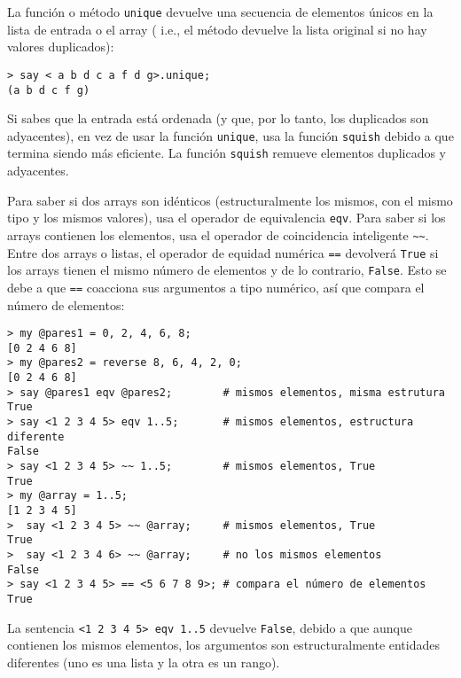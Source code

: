 La función o método {\tt unique} devuelve una secuencia
de elementos únicos en la lista de entrada o el array (
i.e., el método devuelve la lista original si no hay valores
duplicados):

\begin{lstlisting}
> say < a b d c a f d g>.unique;
(a b d c f g)
\end{lstlisting}

Si sabes que la entrada está ordenada (y que, por lo tanto,
los duplicados son adyacentes), en vez de usar la función
{\tt unique}, usa la función {\tt squish} debido a que termina
siendo más eficiente. La función {\tt squish} remueve elementos
duplicados y adyacentes.

Para saber si dos arrays son idénticos (estructuralmente 
los mismos, con el mismo tipo y los mismos valores), usa 
el operador de equivalencia {\tt eqv}. Para saber si los arrays
contienen los elementos, usa el operador de coincidencia inteligente
\verb|~~|. Entre dos arrays o listas, el operador de equidad numérica
\verb|==| devolverá {\tt True} si los arrays tienen el mismo número 
de elementos y de lo contrario, {\tt False}. Esto se debe a que
\verb|==| coacciona sus argumentos a tipo numérico, así que compara
el número de elementos:

\begin{lstlisting}
> my @pares1 = 0, 2, 4, 6, 8;
[0 2 4 6 8]
> my @pares2 = reverse 8, 6, 4, 2, 0;
[0 2 4 6 8]
> say @pares1 eqv @pares2;        # mismos elementos, misma estrutura
True
> say <1 2 3 4 5> eqv 1..5;       # mismos elementos, estructura diferente
False
> say <1 2 3 4 5> ~~ 1..5;        # mismos elementos, True
True
> my @array = 1..5;               
[1 2 3 4 5]
>  say <1 2 3 4 5> ~~ @array;     # mismos elementos, True
True
>  say <1 2 3 4 6> ~~ @array;     # no los mismos elementos
False
> say <1 2 3 4 5> == <5 6 7 8 9>; # compara el número de elementos
True
\end{lstlisting}

La sentencia \verb'<1 2 3 4 5> eqv 1..5' devuelve \verb|False|, debido 
a que aunque contienen los mismos elementos, los argumentos 
son estructuralmente entidades diferentes (uno es una lista y 
la otra es un rango).

